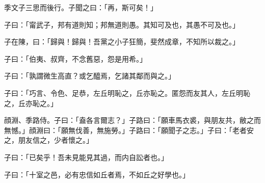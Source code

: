 季文子三思而後行。子聞之曰：「再，斯可矣！」

子曰：「甯武子，邦有道則知；邦無道則愚。其知可及也，其愚不可及也。」

子在陳，曰：「歸與！歸與！吾黨之小子狂簡，斐然成章，不知所以裁之。」

子曰：「伯夷、叔齊，不念舊惡，怨是用希。」

子曰：「孰謂微生高直？或乞醯焉，乞諸其鄰而與之。」

子曰：「巧言、令色、足恭，左丘明恥之，丘亦恥之。匿怨而友其人，左丘明恥之，丘亦恥之。」

顔淵、季路侍。子曰：「盍各言爾志？」子路曰：「願車馬衣裘，與朋友共，敝之而無憾。」顔淵曰：「願無伐善，無施勞。」子路曰：「願聞子之志。」子曰：「老者安之，朋友信之，少者懷之。」

子曰：「已矣乎！吾未見能見其過，而内自訟者也。」

子曰：「十室之邑，必有忠信如丘者焉，不如丘之好學也。」
